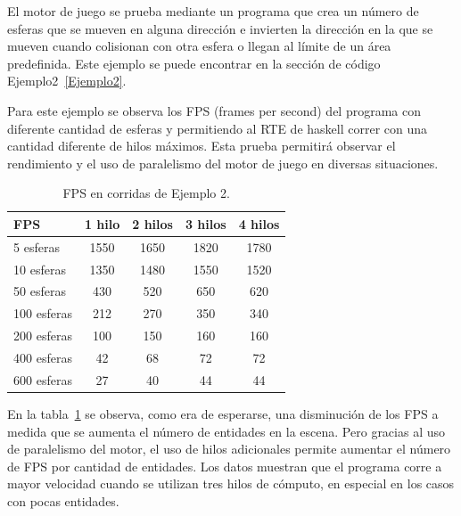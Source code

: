 El motor de juego se prueba mediante un programa que crea un número de esferas que se mueven en alguna dirección e invierten la dirección en la que se mueven cuando colisionan con otra esfera o llegan al límite de un área predefinida. Este ejemplo se puede encontrar en la sección de código Ejemplo2~\ref{Ejemplo2}.

Para este ejemplo se observa los FPS (frames per second) del programa con diferente cantidad de esferas y permitiendo al RTE de haskell correr con una cantidad diferente de hilos máximos. Esta prueba permitirá observar el rendimiento y el uso de paralelismo del motor de juego en diversas situaciones.

\begin{table}
\begin{tabular}{ | l | c | c | c | c | }
 \hline
 FPS & 1 hilo &2 hilos&3 hilos&4 hilos\\
 \hline
 5 esferas & 1550	& 1650	& 1820	& 1780 \\ \hline
 10 esferas & 1350	& 1480	& 1550	& 1520 \\ \hline
 50 esferas & 430	& 520	& 650	& 620 \\ \hline
 100 esferas & 212	& 270	& 350	& 340 \\ \hline
 200 esferas & 100	& 150	& 160	& 160 \\ \hline
 400 esferas & 42	& 68	& 72	& 72 \\ \hline
 600 esferas & 27	& 40	& 44	& 44 \\
 \hline
\end{tabular}
\caption{FPS en corridas de Ejemplo 2.}
\label{table:Ejemplo2}
\end{table}

En la tabla~\ref{table:Ejemplo2} se observa, como era de esperarse, una disminución de los FPS a medida que se aumenta el número de entidades en la escena. Pero gracias al uso de paralelismo del motor, el uso de hilos adicionales permite aumentar el número de FPS por cantidad de entidades. Los datos muestran que el programa corre a mayor velocidad cuando se utilizan tres hilos de cómputo, en especial en los casos con pocas entidades.


